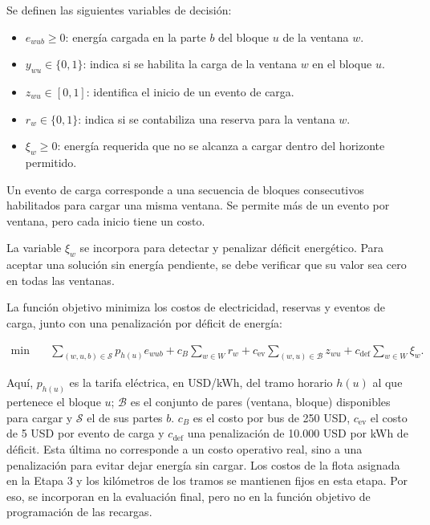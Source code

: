 Se definen las siguientes variables de decisión:
\begin{itemize}
    \item $e_{wub}\geq 0$: energía cargada en la parte $b$
    del bloque $u$ de la ventana $w$.
    \item $y_{wu}\in\{0,1\}$: indica si se habilita la carga
    de la ventana $w$ en el bloque $u$.
    \item $z_{wu}\in[0,1]$: identifica el inicio de un
    evento de carga.
    \item $r_w\in\{0,1\}$: indica si se contabiliza una
    reserva para la ventana $w$.
    \item $\xi_w\geq 0$: energía requerida que no se alcanza
    a cargar dentro del horizonte permitido.
\end{itemize}

Un evento de carga corresponde a una secuencia de bloques
consecutivos habilitados para cargar una misma ventana.
Se permite más de un evento por ventana, pero cada inicio
tiene un costo.

La variable $\xi_w$ se incorpora para detectar y penalizar
déficit energético. Para aceptar una solución sin energía
pendiente, se debe verificar que su valor sea cero en todas
las ventanas.

La función objetivo minimiza los costos de electricidad, reservas y eventos
de carga, junto con una penalización por déficit de energía:

\begin{equation}
\begin{aligned}
\min \quad
&\sum_{(w,u,b)\in\mathcal{S}}p_{h(u)}e_{wub}
+c_B\sum_{w\in W}r_w +
c_{\mathrm{ev}}\sum_{(w,u)\in\mathcal{B}}z_{wu}
+c_{\mathrm{def}}\sum_{w\in W}\xi_w.
\end{aligned}
\label{eq:objetivo_etapa4}
\end{equation}

Aquí, $p_{h(u)}$ es la tarifa eléctrica, en USD/kWh, del tramo horario $h(u)$ al que pertenece el bloque $u$; $\mathcal{B}$ es el conjunto de pares (ventana, bloque) disponibles para cargar y $\mathcal{S}$ el de sus partes $b$. $c_B$ es el costo por bus de 250 USD, $c_{\mathrm{ev}}$ el costo de 5 USD por evento de carga y $c_{\mathrm{def}}$ una penalización de 10.000 USD por kWh de déficit.
Esta última no corresponde a un costo operativo real, sino
a una penalización para evitar dejar energía sin cargar.
Los costos de la flota asignada en la Etapa 3 y los kilómetros
de los tramos se mantienen fijos en esta etapa. Por eso,
se incorporan en la evaluación final, pero no en la función
objetivo de programación de las recargas.


